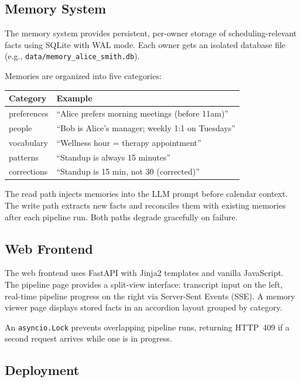 \documentclass[12pt]{article}
\begin{document}
\subsection{Memory System}

The memory system provides persistent, per-owner storage of
scheduling-relevant facts using SQLite with WAL mode. Each owner gets an
isolated database file (e.g., \texttt{data/memory\_alice\_smith.db}).

Memories are organized into five categories:

\begin{center}
\begin{tabular}{@{}ll@{}}
\toprule
\textbf{Category} & \textbf{Example} \\
\midrule
preferences & ``Alice prefers morning meetings (before 11am)'' \\
people      & ``Bob is Alice's manager; weekly 1:1 on Tuesdays'' \\
vocabulary  & ``Wellness hour = therapy appointment'' \\
patterns    & ``Standup is always 15 minutes'' \\
corrections & ``Standup is 15 min, not 30 (corrected)'' \\
\bottomrule
\end{tabular}
\end{center}

The read path injects memories into the LLM prompt before calendar
context. The write path extracts new facts and reconciles them with
existing memories after each pipeline run. Both paths degrade gracefully
on failure.

\subsection{Web Frontend}

The web frontend uses FastAPI with Jinja2 templates and vanilla
JavaScript. The pipeline page provides a split-view interface: transcript
input on the left, real-time pipeline progress on the right via
Server-Sent Events (SSE). A memory viewer page displays stored facts in
an accordion layout grouped by category.

An \texttt{asyncio.Lock} prevents overlapping pipeline runs, returning
HTTP~409 if a second request arrives while one is in progress.

\subsection{Deployment}
\end{document}
